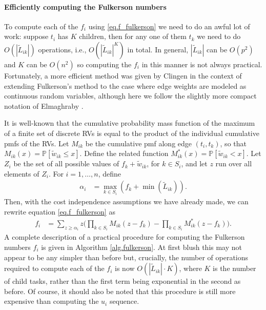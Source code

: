 \documentclass[12pt]{article}
\def\P{\mathbb{P}}
\begin{document}
\paragraph{Efficiently computing the Fulkerson numbers}
\label{para.fulkerson_computing}

To compute each of the $f_i$ using \eqref{eq.f_fulkerson} we need to do an awful lot of work: suppose $t_i$ has $K$ children, then for any one of them $t_k$ we need to do $O(|\tilde{L}_{ik}|)$ operations, i.e., $O(|\tilde{L}_{ik}|^K)$ in total. In general, $|\tilde{L}_{ik}|$ can be $O(p^2)$ and $K$ can be $O(n^2)$ so computing the $f_i$ in this manner is not always practical. Fortunately, a more efficient method was given by Clingen \cite{cling64} in the context of extending Fulkerson's method to the case where edge weights are modeled as continuous random variables, although here we follow the slightly more compact notation of Elmaghraby \cite{elmaghraby67}. 

It is well-known that the cumulative probability mass function of the maximum of a finite set of discrete RVs is equal to the product of the individual cumulative pmfs of the RVs. Let $M_{ik}$ be the cumulative pmf along edge $(t_i, t_k)$, so that $M_{ik}(x) = \P[\tilde{w}_{ik} \leq x]$. Define the related function $M_{ik}^{*}(x) = \P[\tilde{w}_{ik} < x]$. Let $Z_i$ be the set of all possible values of $f_k + \tilde{w}_{ik}$, for $k \in S_i$, and let $z$ run over all elements of $Z_i$. For $i = 1, \dots, n$, define 
\begin{align}
\alpha_i &= \max_{k \in S_i}(f_k + \min(\tilde{L}_{ik})).
\end{align}
Then, with the cost independence assumptions we have already made, we can rewrite equation \eqref{eq.f_fulkerson} as 
\begin{align}
f_i &= \sum_{z \geq \alpha_i} z \bigg( \prod_{k \in S_i} M_{ik}(z - f_k) - \prod_{k \in S_i} M_{ik}^{*}(z - f_k) \bigg). \label{eq.f_clingen}
\end{align}
A complete description of a practical procedure for computing the Fulkerson numbers $f_i$ is given in Algorithm \ref{alg.fulkerson}. At first blush this may not appear to be any simpler than before but, crucially, the number of  operations required to compute each of the $f_i$ is now $O(|\tilde{L}_{ik}| \cdot K)$, where $K$ is the number of child tasks, rather than the first term being exponential in the second as before. Of course, it should also be noted that this procedure is still more expensive than computing the $u_i$ sequence. 
 
\end{document}
